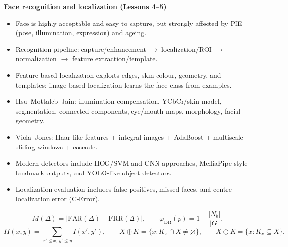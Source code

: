 \documentclass[11pt,a4paper,oneside]{report}
\begin{document}
\begin{keyconcept}
\textbf{Face recognition and localization (Lessons 4--5)}
\begin{itemize}[leftmargin=*,itemsep=0.18em,topsep=0.25em]
    \item Face is highly acceptable and easy to capture, but strongly affected by PIE (pose, illumination, expression) and ageing.
    \item Recognition pipeline: capture/enhancement $\rightarrow$ localization/ROI $\rightarrow$ normalization $\rightarrow$ feature extraction/template.
    \item Feature-based localization exploits edges, skin colour, geometry, and templates; image-based localization learns the face class from examples.
    \item Hsu--Mottaleb--Jain: illumination compensation, YCbCr/skin model, segmentation, connected components, eye/mouth maps, morphology, facial geometry.
    \item Viola--Jones: Haar-like features + integral images + AdaBoost + multiscale sliding windows + cascade.
    \item Modern detectors include HOG/SVM and CNN approaches, MediaPipe-style landmark outputs, and YOLO-like object detectors.
    \item Localization evaluation includes false positives, missed faces, and centre-localization error (C-Error).
\end{itemize}
\end{keyconcept}

\begin{remarkbox}
\small
\[
M(\Delta)=|\mathrm{FAR}(\Delta)-\mathrm{FRR}(\Delta)|,
\qquad
\varphi_{\mathrm{DR}}(p)=1-\frac{|N_b|}{|G|}.
\]
\[
II(x,y)=\sum_{x'\le x,\,y'\le y}I(x',y'),
\qquad
X\oplus K=\{x:K_x\cap X\neq\varnothing\},
\qquad
X\ominus K=\{x:K_x\subseteq X\}.
\]
\normalsize
\end{remarkbox}

\endgroup
\end{document}
